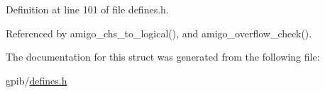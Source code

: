 Definition at line 101 of file defines.\-h.



Referenced by amigo\-\_\-chs\-\_\-to\-\_\-logical(), and amigo\-\_\-overflow\-\_\-check().



The documentation for this struct was generated from the following file\-:\begin{DoxyCompactItemize}
\item 
gpib/\hyperlink{defines_8h}{defines.\-h}\end{DoxyCompactItemize}
